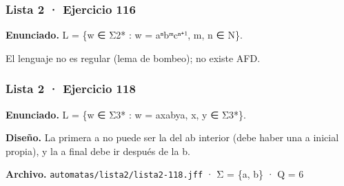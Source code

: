 
\hypertarget{lista-2-ejercicio-116}{%
\subsubsection{Lista 2 · Ejercicio 116}\label{lista-2-ejercicio-116}}

\textbf{Enunciado.} L = \{w ∈ Σ2* : w = aⁿbᵐcⁿ⁺¹, m, n ∈ N\}.

El lenguaje no es regular (lema de bombeo); no existe AFD.

\hypertarget{lista-2-ejercicio-118}{%
\subsubsection{Lista 2 · Ejercicio 118}\label{lista-2-ejercicio-118}}

\textbf{Enunciado.} L = \{w ∈ Σ3* : w = axabya, x, y ∈ Σ3*\}.

\textbf{Diseño.} La primera a no puede ser la del ab interior (debe haber una a inicial propia), y la a final debe ir después de la b.

\textbf{Archivo.} \texttt{automatas/lista2/lista2-118.jff} · Σ = \{a, b\} · \textbar Q\textbar{} = 6

